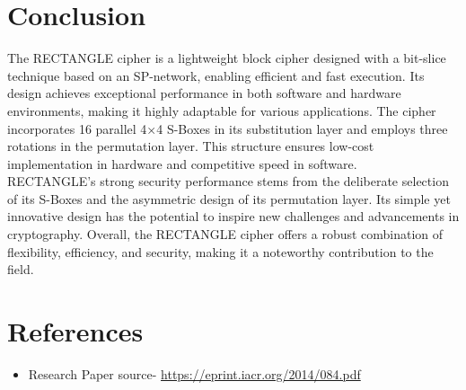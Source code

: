 \documentclass[journal=tosc,preprint]{iacrtrans}
\begin{document}
\section{Conclusion}
The RECTANGLE cipher is a lightweight block cipher designed with a bit-slice technique based on an SP-network, enabling efficient and fast execution. Its design achieves exceptional performance in both software and hardware environments, making it highly adaptable for various applications. The cipher incorporates 16 parallel 4×4 S-Boxes in its substitution layer and employs three rotations in the permutation layer. This structure ensures low-cost implementation in hardware and competitive speed in software.\\
RECTANGLE's strong security performance stems from the deliberate selection of its S-Boxes and the asymmetric design of its permutation layer. Its simple yet innovative design has the potential to inspire new challenges and advancements in cryptography. Overall, the RECTANGLE cipher offers a robust combination of flexibility, efficiency, and security, making it a noteworthy contribution to the field.
\section{References}
\begin{itemize}
    \item  Research Paper source- \href{https://eprint.iacr.org/2014/084.pdf}{https://eprint.iacr.org/2014/084.pdf}
\end{itemize}

% 
% 
\end{document}
